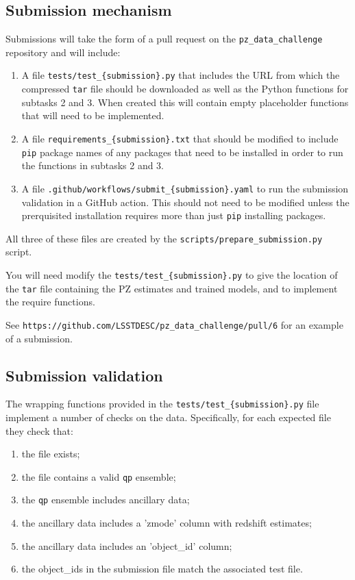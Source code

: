 \subsection{Submission mechanism}

Submissions will take the form of a pull request on the
\texttt{pz\_data\_challenge} repository and will include:

\begin{enumerate}
  \item{A file \texttt{tests/test\_\{submission\}.py} that includes the
      URL from which the compressed \texttt{tar} file should be downloaded
      as well as the Python functions for subtasks 2 and 3.   When
      created this will contain empty placeholder functions that will
      need to be implemented.}
   \item{A file \texttt{requirements\_\{submission\}.txt} that should
       be modified to include \texttt{pip} package names of any
       packages that need to be installed in order to run the
       functions in subtasks 2 and 3.}     
   \item{A file \texttt{.github/workflows/submit\_\{submission\}.yaml} to
       run the submission validation in a GitHub action.  This should
       not need to be modified unless the prerquisited installation
       requires more than just \texttt{pip}  installing packages.}
\end{enumerate}

All three of these files are created by the
\texttt{scripts/prepare\_submission.py} script.  

You will need modify the \texttt{tests/test\_\{submission\}.py} to
give the location of the \texttt{tar} file containing the PZ estimates
and trained models, and to implement the require functions.

See \texttt{https://github.com/LSSTDESC/pz\_data\_challenge/pull/6}
for an example of a submission.


\subsection{Submission validation}

The wrapping functions provided in the \texttt{tests/test\_\{submission\}.py}
file implement a number of \allowbreak checks on the data. Specifically, for each
expected file they check that:

\begin{enumerate}
    \item{the file exists;}
    \item{the file contains a valid \texttt{qp} ensemble;}
    \item{the \texttt{qp} ensemble includes ancillary data;}
    \item{the ancillary data includes a 'zmode' column with redshift
        estimates;}
    \item{the ancillary data includes an 'object\_id' column;}
    \item{the object\_ids in the submission file match the associated
        test file.}
\end{enumerate}

